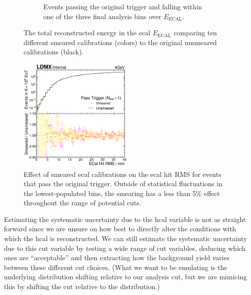 \begin{figure}
\begin{subfigure}[t]{0.48\textwidth}
    \caption{Events passing the original trigger and falling within one of the three
    final analysis bins over $E_\text{ECAL}$.}
    \label{fig:4gev-smeared-unsmeared-comp:pass-trigger}
  \end{subfigure}
  \caption{The total reconstructed energy in the \ac{ecal} $E_\text{ECAL}$ comparing 
  ten different smeared calibrations (colors) to the original unsmeared calibrations
  (black).}
  \label{fig:4gev-smeared-unsmeared-comp}
\end{figure}

\begin{figure}
  \centering
  \includegraphics[width=0.5\textwidth]{figures/ldmx/analysis/systematics/4gev-pass-trigger-uncorrcell-ecal-hit-rms.pdf}
  \caption{Effect of smeared \ac{ecal} calibrations on the \ac{ecal} hit RMS for events
  that pass the original trigger.
  Outside of statistical fluctuations in the lowest-populated bins, the smearing has
  a less than 5\% effect throughout the range of potential cuts.}
  \label{fig:4gev-smeared-unsmeared-ecal-hit-rms}
\end{figure}

Estimating the systematic uncertainty due to the \ac{hcal} variable is not as
straight forward since we are unsure on how best to directly alter the conditions
with which the \ac{hcal} is reconstructed.
We can still estimate the systematic uncertainty due to this cut variable
by testing a wide range of cut variables, deducing which ones
are ``acceptable'' and then extracting how the background yield varies between these
different cut choices.
(What we want to be emulating is the underlying distribution shifting relative
to our analysis cut, but we are mimicing this by shifting the cut relative to the
distribution.)


